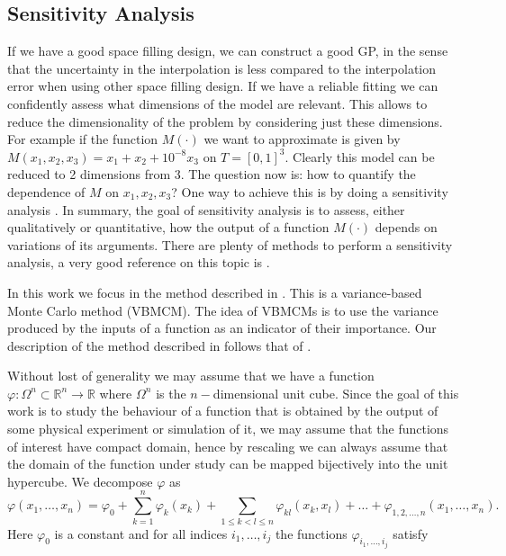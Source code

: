 \documentclass[12pt]{book}
\begin{document}
\subsection{Sensitivity Analysis}
 
If we have a good space filling design, we can construct a good GP, in the sense that 
the uncertainty in the interpolation is less compared to the interpolation error when
using other space filling design. 
If we have a reliable fitting we can confidently assess what dimensions of the model are relevant.
This allows to reduce the dimensionality of the problem by considering just these dimensions.
For 
example if the function $M(\cdot)$ we want to approximate is given  
by $M(x_{1},x_{2},x_{3})=x_{1}+x_{2}+10^{-8}x_{3}$ 
on $T=[0,1]^{3}$. Clearly this model can be reduced to   2 dimensions from 3. 
The question  now is: how to quantify the 
dependence  of $M$ on $x_{1},x_{2},x_{3}$? One way to achieve this is by doing a 
sensitivity analysis . In summary, the goal of 
sensitivity analysis is to assess, either qualitatively or quantitative, how
the output of a function $M(\cdot)$ depends on variations of its arguments. There are plenty of 
methods to perform a sensitivity analysis, a very good reference on this topic is
\cite{saltelli2000sensitivity}.




In this work we  focus in
the method  described in \cite{sobol1993sensitivity}. This  is a variance-based Monte Carlo method (VBMCM).
The idea of  VBMCMs is to use the variance produced by  the inputs of a function as an indicator of 
their importance.
Our description of the method described in \cite{sobol1993sensitivity} 
follows that of \cite{saltelli2000sensitivity}.


Without lost of generality we may assume that we have a function 
$\varphi: \Omega^{n}\subset\mathbb{R}^{n}\longrightarrow \mathbb{R}$ where $\Omega^{n}$ is the $n-$dimensional
unit cube. Since the goal of this work is to study the behaviour of a function that is obtained by the output
of some physical experiment or simulation of it, we may assume that the functions of interest 
 have  compact domain, hence by  rescaling we can always assume that the domain of the function
under study can be mapped bijectively into the unit hypercube. We decompose $\varphi$ as 
\begin{equation*}
\varphi(x_{1},\ldots,x_{n})=\varphi_{0}+\sum_{k=1}^{n}\varphi_{k}(x_{k})+
\sum_{1\leq k< l\leq n}\varphi_{kl}(x_{k},x_{l})+\ldots+
\varphi_{1,2,\ldots,n}(x_{1},\ldots,x_{n}).
\end{equation*}
Here $\varphi_{0}$ is a constant and for all  indices $i_{1},\ldots,i_{j}$ the functions
$\varphi_{i_{1},\ldots,i_{j}}$ satisfy
\end{document}
